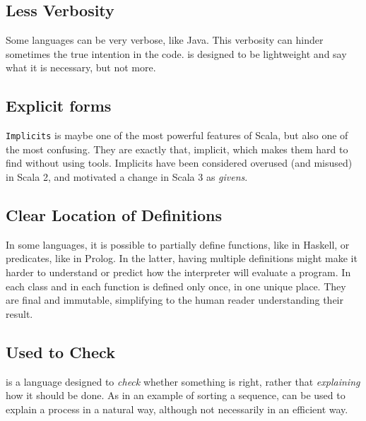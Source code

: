 \subsection{Less Verbosity}

Some languages can be very verbose, like Java.
This verbosity can hinder sometimes the true intention in the code.
\Soda is designed to be lightweight and say what it is necessary, but not more.

\subsection{Explicit forms}

\texttt{Implicits} is maybe one of the most powerful features of Scala, but also one of the most confusing.
They are exactly that, implicit, which makes them hard to find without using tools.
Implicits have been considered overused (and misused) in Scala 2, and motivated a change in Scala 3 as \textit{givens}.

\subsection{Clear Location of Definitions}

In some languages, it is possible to partially define functions, like in Haskell, or predicates, like in Prolog.
In the latter, having multiple definitions might make it harder to understand or predict how the interpreter will evaluate a program.
In \Soda each class and in each function is defined only once, in one unique place.
They are final and immutable, simplifying to the human reader understanding their result.

\subsection{Used to Check}

\Soda is a language designed to \textit{check} whether something is right, rather that \textit{explaining} how it should be done.
As in an example of sorting a sequence, \Soda can be used to explain a process in a natural way, although not necessarily in an efficient way.


